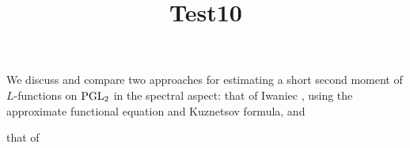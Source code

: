 \documentclass[reqno]{amsart} 
\title{Test10}
\numberwithin{equation}{section}
\numberwithin{theorem}{section}
\begin{document}
\maketitle
\tableofcontents



We discuss and compare two approaches for estimating a short second moment of $L$-functions on $\operatorname{PGL}_2$ in the spectral aspect: that of Iwaniec \cite{Iwaniec1992}, using the approximate functional equation and Kuznetsov formula, and

that of \cite[\S5.1.4]{michel-2009}



{} 
\end{document}
